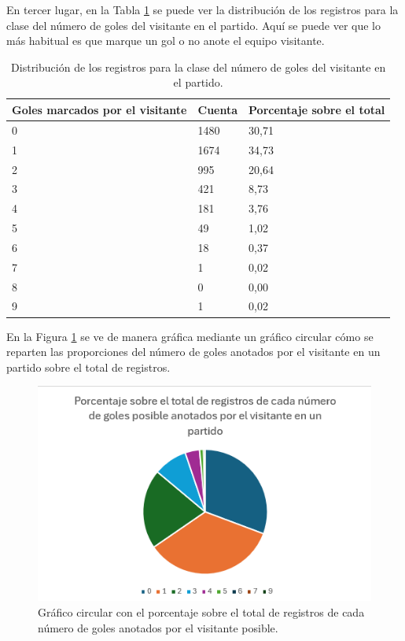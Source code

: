 En tercer lugar, en la Tabla \ref{fig:distribucion-visitante} se puede ver la distribución de los registros para la clase del número de goles del visitante en el partido. Aquí se puede ver que lo más habitual es que marque un gol o no anote el equipo visitante.
\begin{table}[]
    \centering
    \begin{tabular}{|l|l|l|}
    \hline
    \rowcolor[HTML]{C0C0C0} 
    Goles marcados por el visitante & Cuenta & Porcentaje sobre el total \\ \hline
    0     & 1480   & 30,71                     \\ \hline
    1            & 1674   & 34,73                     \\ \hline
    2 & 995   & 20,64                     \\ \hline
    3 & 421   & 8,73                     \\ \hline
    4 & 181   & 3,76                    \\ \hline
    5 & 49   & 1,02                     \\ \hline
    6 & 18   & 0,37                     \\ \hline
    7 & 1   & 0,02                     \\ \hline
    8 & 0   & 0,00                     \\ \hline
    9 & 1   & 0,02                     \\ \hline
    \end{tabular}
    \caption{Distribución de los registros para la clase del número de goles del visitante en el partido. }
    \label{fig:distribucion-visitante}
\end{table}

En la Figura \ref{fig:grafico-circular-visitante} se ve de manera gráfica mediante un gráfico circular cómo se reparten las proporciones del número de goles anotados por el visitante en un partido sobre el total de registros.
\begin{figure}[H]
    \centering
    \includegraphics[scale=0.75]{svg/grafico-circular-visitante.png}
    \caption{Gráfico circular con el porcentaje sobre el total de registros de cada número de goles anotados por el visitante posible. }
    \label{fig:grafico-circular-visitante}
\end{figure}

